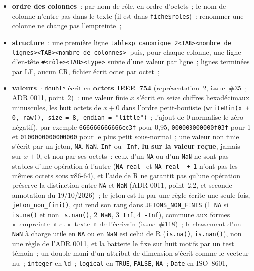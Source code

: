 \documentclass[a4paper,11pt]{article}
\newcommand{\code}[1]{\texttt{\small #1}}
\begin{document}
\begin{itemize}[leftmargin=*, itemsep=2pt]
    observations) devant au contraire différer~; tout double qui n'est dans
    aucune de ces deux classes («~double non classé~») fait échouer le
    test~;
  \item \textbf{ordre des colonnes}~: par nom de rôle, en ordre d'octets~; le
    nom de colonne n'entre pas dans le texte (il est dans \code{fiche\$roles})~:
    renommer une colonne ne change pas l'empreinte~;
  \item \textbf{structure}~: une première ligne
    \code{tablexp canonique 2<TAB><nombre de lignes><TAB><nombre de colonnes>},
    puis, pour chaque colonne, une ligne d'en-tête \code{\#<rôle><TAB><type>}
    suivie d'une valeur par ligne~; lignes terminées par LF, aucun CR, fichier
    écrit octet par octet~;
  \item \textbf{valeurs}~: \code{double} écrit en \textbf{octets IEEE~754}
    (représentation~2, issue~\#35~; ADR 0011, point~2)~: une valeur finie $x$
    s'écrit en seize chiffres hexadécimaux minuscules, les huit octets de
    $x + 0$ dans l'ordre petit-boutiste
    (\code{writeBin(x + 0, raw(), size = 8, endian = "little")}~; l'ajout de
    0 normalise le zéro négatif), par exemple \code{666666666666ee3f} pour
    0,95, \code{000000000000f03f} pour 1 et \code{0100000000000000} pour le
    plus petit sous-normal~; une valeur non finie s'écrit par un jeton,
    \code{NA}, \code{NaN}, \code{Inf} ou \code{-Inf}, \textbf{lu sur la
    valeur reçue}, jamais sur $x + 0$, et non par ses octets~: ceux d'un
    \code{NA} ou d'un \code{NaN} ne sont pas stables d'une opération à
    l'autre (\code{NA\_real\_} et \code{NA\_real\_ + 1} n'ont pas les mêmes
    octets sous x86-64), et l'aide de R ne garantit pas qu'une opération
    préserve la distinction entre \code{NA} et \code{NaN} (ADR 0011,
    point~2.2, et seconde annotation du 19/10/2026)~; le jeton est lu par
    une règle écrite une seule fois, \code{jeton\_non\_fini()}, qui rend
    son rang dans \code{JETONS\_NON\_FINIS} (1~\code{NA} si
    \code{is.na()} et non \code{is.nan()}, 2~\code{NaN}, 3~\code{Inf},
    4~\code{-Inf}), commune aux formes «~empreinte~» et «~texte~» de
    l'écrivain (issue~\#118)~; le classement d'un \code{NaN} à charge utile
    en \code{NA} ou en \code{NaN} est celui de R (\code{is.na()},
    \code{is.nan()}), non une règle de l'ADR 0011, et la batterie le fixe
    sur huit motifs par un test témoin~; un double muni d'un
    attribut de dimension s'écrit comme le vecteur nu~;
    \code{integer} en \code{\%d}~; \code{logical} en
    \code{TRUE}, \code{FALSE}, \code{NA}~; \code{Date} en ISO~8601,

\end{itemize}
\end{document}
